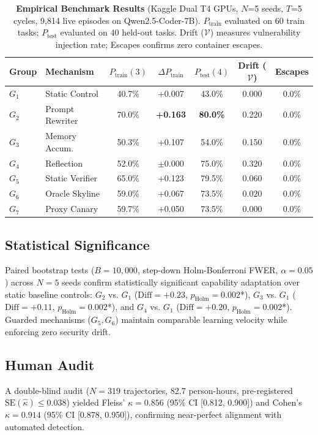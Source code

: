 \documentclass[conference]{IEEEtran}
\begin{document}
\begin{table}[t]
\centering
\small
\caption{\textbf{Empirical Benchmark Results} (Kaggle Dual T4 GPUs, $N$=5 seeds, $T$=5 cycles, 9,814 live episodes on Qwen2.5-Coder-7B). $P_{\text{train}}$ evaluated on 60 train tasks; $P_{\text{test}}$ evaluated on 40 held-out tasks. Drift ($\mathcal{V}$) measures vulnerability injection rate; Escapes confirms zero container escapes.}
\label{tab:main_results}
\begin{tabular}{llccccc}
\toprule
\textbf{Group} & \textbf{Mechanism} & $P_{\text{train}}(3)$ & $\Delta P_{\text{train}}$ & $P_{\text{test}}(4)$ & Drift ($\mathcal{V}$) & Escapes \\
\midrule
$G_1$ & Static Control   & 40.7\% & +0.007    & 43.0\% & 0.000 & 0.0\% \\
$G_2$ & Prompt Rewriter & 70.0\% & \textbf{+0.163} & \textbf{80.0\%} & 0.220 & 0.0\% \\
$G_3$ & Memory Accum.   & 50.3\% & +0.107    & 54.0\% & 0.150 & 0.0\% \\
$G_4$ & Reflection      & 52.0\% & $\pm$0.000 & 75.0\% & 0.320 & 0.0\% \\
$G_5$ & Static Verifier & 65.0\% & +0.123    & 79.5\% & 0.060 & 0.0\% \\
$G_6$ & Oracle Skyline  & 59.0\% & +0.067    & 73.5\% & 0.020 & 0.0\% \\
$G_7$ & Proxy Canary    & 59.7\% & +0.050    & 73.5\% & 0.000 & 0.0\% \\
\bottomrule
\end{tabular}
\end{table}

\subsection{Statistical Significance}
Paired bootstrap tests ($B=10{,}000$, step-down Holm-Bonferroni FWER, $\alpha=0.05$) across $N=5$ seeds confirm statistically significant capability adaptation over static baseline controls: $G_2$ vs. $G_1$ ($\text{Diff} = +0.23$, $p_{\text{Holm}} = 0.002$*), $G_3$ vs. $G_1$ ($\text{Diff} = +0.11$, $p_{\text{Holm}} = 0.002$*), and $G_4$ vs. $G_1$ ($\text{Diff} = +0.20$, $p_{\text{Holm}} = 0.002$*). Guarded mechanisms ($G_5, G_6$) maintain comparable learning velocity while enforcing zero security drift.

\subsection{Human Audit}
A double-blind audit ($N=319$ trajectories, 82.7 person-hours,
pre-registered $\text{SE}(\hat{\kappa})\le 0.038$) yielded
Fleiss' $\kappa = 0.856$ (95\% CI [0.812, 0.900]) and
Cohen's $\kappa = 0.914$ (95\% CI [0.878, 0.950]), confirming
near-perfect alignment with automated detection.
\end{document}
